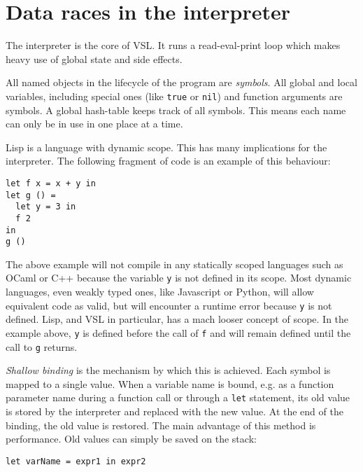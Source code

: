 
\section{Data races in the interpreter}
\label{sec:symbols}
\label{sec:datarace}
The interpreter is the core of VSL. It runs a read-eval-print loop which makes heavy use of global state and side effects.

All named objects in the lifecycle of the program are \emph{symbols}. All global and local variables, including
special ones (like \texttt{true} or \texttt{nil}) and function arguments are symbols. A global hash-table keeps track of
all symbols. This means each name can only be in use in one place at a time.

Lisp is a language with dynamic scope. This has many implications for the interpreter. The following
fragment of code is an example of this behaviour:
\begin{verbatim}
let f x = x + y in
let g () =
  let y = 3 in
  f 2
in
g ()
\end{verbatim}

The above example will not compile in any statically scoped languages such as OCaml or C++
because the variable \texttt{y} is not defined in its scope.
Most dynamic languages, even weakly typed ones, like Javascript or Python, will allow equivalent
code as valid, but will encounter a runtime error because \texttt{y} is not defined.
Lisp, and VSL in particular, has a mach looser concept of scope.
In the example above, \texttt{y} is defined before the call of \texttt{f} and will remain defined until the
call to \texttt{g} returns.

\emph{Shallow binding} is the mechanism by which this is achieved. Each symbol is mapped to a single value.
When a variable name is bound, e.g. as a function parameter name during a function call or through a
\texttt{let} statement, its old value is stored by the interpreter and replaced with the new value. At the end of the binding,
the old value is restored. The main advantage of this method is performance. Old values can simply be saved
on the stack:
\begin{verbatim}
let varName = expr1 in expr2
\end{verbatim}

